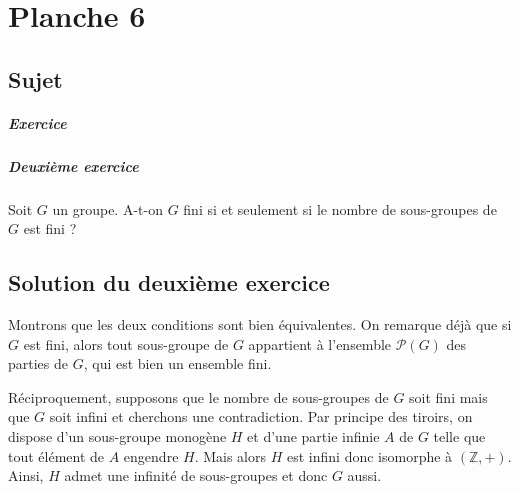 \chapter{Planche 6}

\section{Sujet}

\paragraph{Exercice}

\paragraph{Deuxième exercice}
Soit $G$ un groupe. A-t-on $G$ fini si et seulement si le nombre de sous-groupes de $G$ est fini ?

\section{Solution du deuxième exercice}

Montrons que les deux conditions sont bien équivalentes. On remarque déjà que si 
$G$ est fini, alors tout sous-groupe de $G$ appartient à l'ensemble $\mathscr P(G)$ des parties de $G$, qui est bien un ensemble fini.

Réciproquement, supposons que le nombre de sous-groupes de $G$ soit fini mais que $G$ soit infini et cherchons une contradiction.
Par principe des tiroirs, on dispose d'un sous-groupe monogène $H$ et d'une partie infinie $A$ de $G$ telle que tout élément de $A$ engendre $H$.
Mais alors $H$ est infini donc isomorphe à $(\mathbb Z,+)$. Ainsi, $H$ admet une infinité de sous-groupes et donc $G$ aussi.
